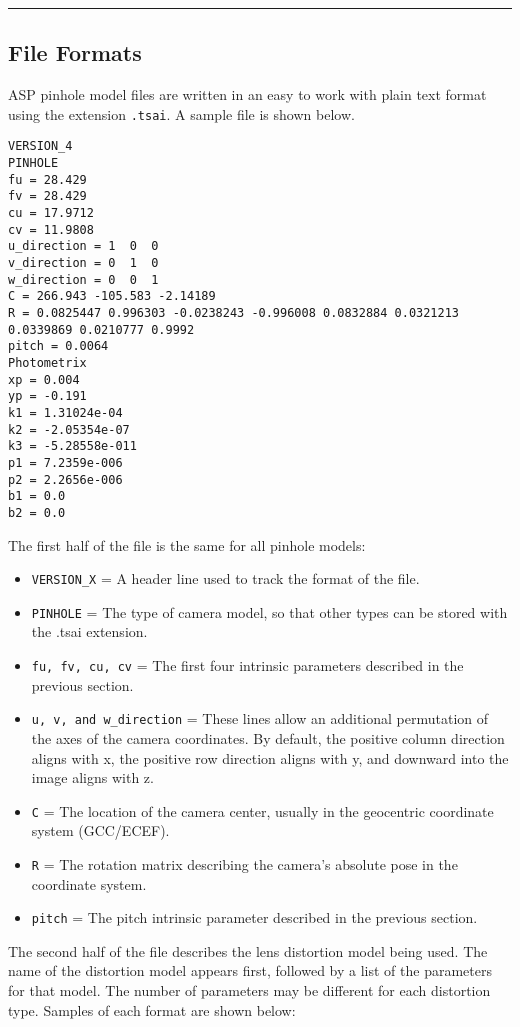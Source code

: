 \hrule
\subsection{File Formats}
\label{file_format}
\bigskip

ASP pinhole model files are written in an easy to work with plain text format 
using the extension \texttt{.tsai}.
A sample file is shown below. 

\begin{verbatim}
VERSION_4
PINHOLE
fu = 28.429
fv = 28.429
cu = 17.9712
cv = 11.9808
u_direction = 1  0  0
v_direction = 0  1  0
w_direction = 0  0  1
C = 266.943 -105.583 -2.14189
R = 0.0825447 0.996303 -0.0238243 -0.996008 0.0832884 0.0321213 0.0339869 0.0210777 0.9992
pitch = 0.0064
Photometrix
xp = 0.004
yp = -0.191
k1 = 1.31024e-04
k2 = -2.05354e-07
k3 = -5.28558e-011
p1 = 7.2359e-006
p2 = 2.2656e-006
b1 = 0.0
b2 = 0.0
\end{verbatim}

The first half of the file is the same for all pinhole models:

\begin{itemize}{}
\item  \texttt{VERSION\_X} = A header line used to track the format of the file.
\item  \texttt{PINHOLE} = The type of camera model, so that other types can be stored with the .tsai extension.
\item  \texttt{fu, fv, cu, cv} = The first four intrinsic parameters described in the previous section.
\item  \texttt{u, v, and w\_direction} = These lines allow an additional permutation of the 
axes of the camera coordinates.  By default, the positive column direction aligns with x, the
positive row direction aligns with y, and downward into the image aligns with z.
\item  \texttt{C} = The location of the camera center, usually in the geocentric coordinate system (GCC/ECEF).
\item  \texttt{R} = The rotation matrix describing the camera's absolute pose in the coordinate system.
\item  \texttt{pitch} = The pitch intrinsic parameter described in the previous section.
\end{itemize}

The second half of the file describes the lens distortion model being used.  The name of the
distortion model appears first, followed by a list of the parameters for that model.  The number
of parameters may be different for each distortion type.  Samples of each format are shown below:

